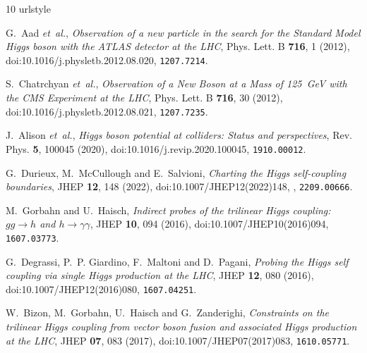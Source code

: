 \documentclass{SciPost}
\begin{document}
\begin{thebibliography}{10}
\providecommand{\url}[1]{\texttt{#1}}
\providecommand{\urlprefix}{URL }
\expandafter\ifx\csname urlstyle\endcsname\relax
  \providecommand{\doi}[1]{doi:\discretionary{}{}{}#1}\else
  \providecommand{\doi}{doi:\discretionary{}{}{}\begingroup \urlstyle{rm}\Url}\fi
\providecommand{\eprint}[2][]{\url{#2}}

G.~Aad \emph{et~al.},
\newblock \emph{{Observation of a new particle in the search for the Standard Model Higgs boson with the ATLAS detector at the LHC}},
\newblock Phys. Lett. B \textbf{716}, 1 (2012),
\newblock \doi{10.1016/j.physletb.2012.08.020},
\newblock \eprint{1207.7214}.

S.~Chatrchyan \emph{et~al.},
\newblock \emph{{Observation of a New Boson at a Mass of 125~GeV with the CMS Experiment at the LHC}},
\newblock Phys. Lett. B \textbf{716}, 30 (2012),
\newblock \doi{10.1016/j.physletb.2012.08.021},
\newblock \eprint{1207.7235}.

J.~Alison \emph{et~al.},
\newblock \emph{{Higgs boson potential at colliders: Status and perspectives}},
\newblock Rev. Phys. \textbf{5}, 100045 (2020),
\newblock \doi{10.1016/j.revip.2020.100045},
\newblock \eprint{1910.00012}.

G.~Durieux, M.~McCullough and E.~Salvioni,
\newblock \emph{{Charting the Higgs self-coupling boundaries}},
\newblock JHEP \textbf{12}, 148 (2022),
\newblock \doi{10.1007/JHEP12(2022)148},
,
\newblock \eprint{2209.00666}.

M.~Gorbahn and U.~Haisch,
\newblock \emph{{Indirect probes of the trilinear Higgs coupling: $gg \to h$ and $h \to \gamma \gamma$}},
\newblock JHEP \textbf{10}, 094 (2016),
\newblock \doi{10.1007/JHEP10(2016)094},
\newblock \eprint{1607.03773}.

G.~Degrassi, P.~P. Giardino, F.~Maltoni and D.~Pagani,
\newblock \emph{{Probing the Higgs self coupling via single Higgs production at the LHC}},
\newblock JHEP \textbf{12}, 080 (2016),
\newblock \doi{10.1007/JHEP12(2016)080},
\newblock \eprint{1607.04251}.

W.~Bizon, M.~Gorbahn, U.~Haisch and G.~Zanderighi,
\newblock \emph{{Constraints on the trilinear Higgs coupling from vector boson fusion and associated Higgs production at the LHC}},
\newblock JHEP \textbf{07}, 083 (2017),
\newblock \doi{10.1007/JHEP07(2017)083},
\newblock \eprint{1610.05771}.


\end{thebibliography}
\end{document}
